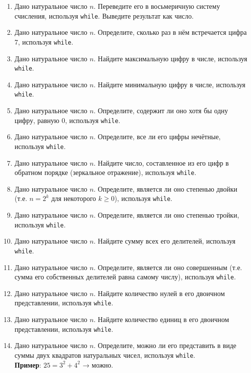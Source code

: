\documentclass[12pt]{article}
\begin{document}
\begin{enumerate}
    \item Дано натуральное число $n$. Переведите его в восьмеричную систему счисления, используя \texttt{while}. Выведите результат как число.

    \item Дано натуральное число $n$. Определите, сколько раз в нём встречается цифра 7, используя \texttt{while}.

    \item Дано натуральное число $n$. Найдите максимальную цифру в числе, используя \texttt{while}.

    \item Дано натуральное число $n$. Найдите минимальную цифру в числе, используя \texttt{while}.

    \item Дано натуральное число $n$. Определите, содержит ли оно хотя бы одну цифру, равную 0, используя \texttt{while}.

    \item Дано натуральное число $n$. Определите, все ли его цифры нечётные, используя \texttt{while}.

    \item Дано натуральное число $n$. Найдите число, составленное из его цифр в обратном порядке (зеркальное отражение), используя \texttt{while}.

    \item Дано натуральное число $n$. Определите, является ли оно степенью двойки (т.е. $n = 2^k$ для некоторого $k \geqslant 0$), используя \texttt{while}.

    \item Дано натуральное число $n$. Определите, является ли оно степенью тройки, используя \texttt{while}.

    \item Дано натуральное число $n$. Найдите сумму всех его делителей, используя \texttt{while}.

    \item Дано натуральное число $n$. Определите, является ли оно совершенным (т.е. сумма его собственных делителей равна самому числу), используя \texttt{while}.

    \item Дано натуральное число $n$. Найдите количество нулей в его двоичном представлении, используя \texttt{while}.

    \item Дано натуральное число $n$. Найдите количество единиц в его двоичном представлении, используя \texttt{while}.

    \item Дано натуральное число $n$. Определите, можно ли его представить в виде суммы двух квадратов натуральных чисел, используя \texttt{while}. \\
    \textbf{Пример}: $25 = 3^2 + 4^2$ → можно.
\end{enumerate}
\end{document}

